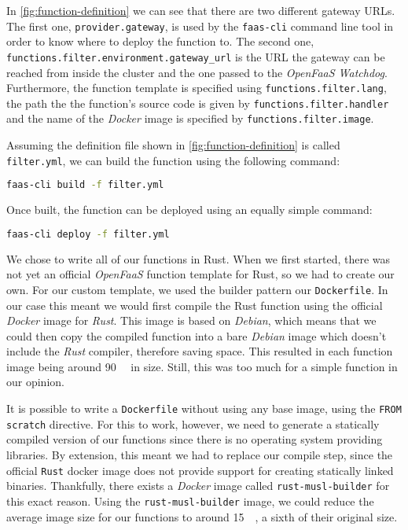 In \autoref{fig:function-definition} we can see that there are two different gateway URLs. The
first one, \texttt{provider.gateway}, is used by the \texttt{faas-cli} command line tool in order to
know where to deploy the function to. The second one,
\texttt{functions.filter.environment.gateway\_url} is the URL the gateway can be reached from inside
the cluster and the one passed to the \textit{OpenFaaS Watchdog}. Furthermore, the function template
is specified using \texttt{functions.filter.lang}, the path the the function's source code is given
by \texttt{functions.filter.handler} and the name of the \textit{Docker} image is specified by
\texttt{functions.filter.image}.

Assuming the definition file shown in \autoref{fig:function-definition} is called
\texttt{filter.yml}, we can build the function using the following command:

\begin{lstlisting}[language=bash]
faas-cli build -f filter.yml
\end{lstlisting}

Once built, the function can be deployed using an equally simple command:

\begin{lstlisting}[language=bash]
faas-cli deploy -f filter.yml
\end{lstlisting}

We chose to write all of our functions in Rust. When we first started, there was not yet an official
\textit{OpenFaaS} function template for Rust, so we had to create our own. For our custom template,
we used the builder pattern our \texttt{Dockerfile}. In our case this meant we would first compile
the Rust function using the official \textit{Docker} image for \textit{Rust}. This image is based on
\textit{Debian}, which means that we could then copy the compiled function into a bare
\textit{Debian} image which doesn't include the \textit{Rust} compiler, therefore saving space. This
resulted in each function image being around \SI{90}{\mega\byte} in size. Still, this was too much
for a simple function in our opinion.

It is possible to write a \texttt{Dockerfile} without using any base image, using the \texttt{FROM
scratch} directive. For this to work, however, we need to generate a statically compiled version of
our functions since there is no operating system providing libraries. By extension, this meant we
had to replace our compile step, since the official \texttt{Rust} docker image does not provide
support for creating statically linked binaries. Thankfully, there exists a \textit{Docker} image
called \texttt{rust-musl-builder} \cite{rust-musl-builder} for this exact reason. Using the
\texttt{rust-musl-builder} image, we could reduce the average image size for our functions to around
\SI{15}{\mega\byte}, a sixth of their original size.






